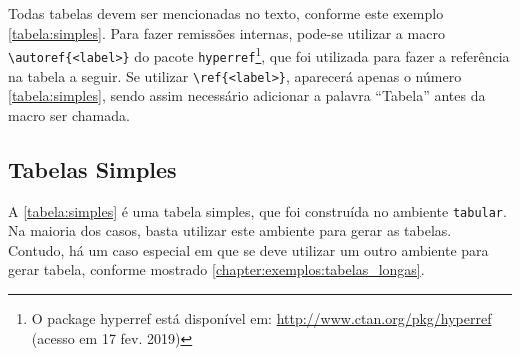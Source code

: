 \documentclass[
  12pt,		%
  a4paper,	%
  openright,%
  oneside,	%
  chapter=TITLE,		%
  section=TITLE,		%
  english,	%
  french,	%
  spanish,	%
  brazil
]{abntex2}
\begin{document}
                Todas tabelas devem ser mencionadas no texto, conforme este exemplo \autoref{tabela:simples}. Para fazer remissões internas, pode-se utilizar a macro \verb|\autoref{<label>}| do pacote \verb|hyperref|\footnote{O package hyperref está disponível em: \url{http://www.ctan.org/pkg/hyperref} (acesso em 17 fev. 2019)}, que foi utilizada para fazer a referência na tabela a seguir. Se utilizar \verb|\ref{<label>}|, aparecerá apenas o número \ref{tabela:simples}, sendo assim necessário adicionar a palavra ``Tabela'' antes da macro ser chamada. 

         
         \subsection {Tabelas Simples}
                
                A \autoref{tabela:simples} é uma tabela simples, que foi construída no ambiente \verb|tabular|. Na maioria dos casos, basta utilizar este ambiente para gerar as tabelas. Contudo, há um caso especial em que se deve utilizar um outro ambiente para gerar tabela, conforme mostrado \autoref{chapter:exemplos:tabelas_longas}. 
                
                \begin{table}[h]
                \end{table}
                
                
\end{document}

